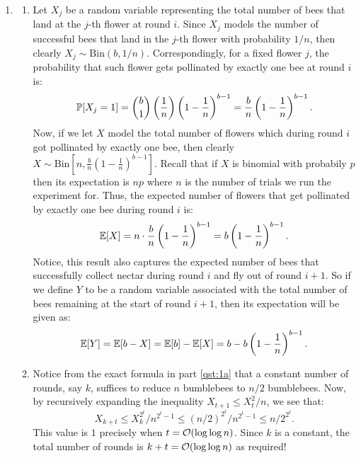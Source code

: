 \documentclass{article}
\begin{document}
\begin{enumerate}[leftmargin={*}, font={\bf}, label={\arabic*.}, ref={\arabic*}]
  \item \label{qst:1}
    \begin{enumerate}[ref={(\alph*)}]
      \item \label{qst:1a}
        Let $X_j$ be a random variable representing the total number of bees that land at the $j$-th
        flower at round $i$. Since $X_j$ models the number of successful bees that land in the $j$-th
        flower with probability $1/n$, then clearly $X_j \sim \text{Bin}(b, 1/n)$.  Correspondingly,
        for a fixed flower $j$, the probability that such flower gets pollinated by exactly one bee
        at round $i$ is:
        \[
          \P[X_j = 1] = {b \choose 1} \left(\frac{1}{n}\right) \left(1-\frac{1}{n}\right)^{b-1}
                      = \frac{b}{n} \left(1-\frac{1}{n}\right)^{b-1}.
        \]
        Now, if we let $X$ model the total number of flowers which during round $i$ got pollinated
        by exactly one bee, then clearly $X \sim \text{Bin}\left[n, \frac{b}{n} \left(1-\frac{1}{n}
        \right)^{b-1}\right]$. Recall that if $X$ is binomial with probabily $p$ then its expectation
        is $np$ where $n$ is the number of trials we run the experiment for. Thus, the expected number
        of flowers that get pollinated by exactly one bee during round $i$ is:
        \[
          \E[X] = n \cdot \frac{b}{n} \left(1-\frac{1}{n}\right)^{b-1} = b \left(1-\frac{1}{n}\right)^{b-1}.
        \]
        Notice, this result also captures the expected number of bees that successfully collect
        nectar during round $i$ and fly out of round $i+1$. So if we define $Y$ to be a random
        variable associated with the total number of bees remaining at the start of round $i+1$,
        then its expectation will be given as:
        \[ 
          \E[Y] = \E[b - X] = \E[b] - \E[X] = b - b \left(1-\frac{1}{n}\right)^{b-1}.
        \]

      \item \label{qst:1b}
        Notice from the exact formula in part \ref{qst:1a} that a constant number of rounds, say
        $k$, suffices to reduce $n$ bumblebees to $n/2$ bumblebees. Now, by recursively expanding
        the inequality $X_{t+1} \leq X_t^2/n$, we see that:
        \[
          X_{k+t} \leq X_k^{2^t}/n^{2^t-1} \leq (n/2)^{2^t}/n^{2^t-1} \leq n/2^{2^t}.
        \]
        This value is $1$ precisely when $t = \O(\log \log n)$. Since $k$ is a constant, the total
        number of rounds is $k + t = \O(\log \log n)$ as required!
    \end{enumerate}


\end{enumerate}
\end{document}
